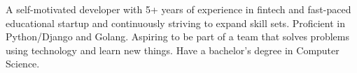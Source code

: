 

\begin{cvparagraph}

\vspace{1mm}
A self-motivated developer with 5+ years of experience in fintech and fast-paced educational startup
and continuously striving to expand skill sets. Proficient in Python/Django and Golang.
Aspiring to be part of a team that solves problems using technology and learn new things. Have a bachelor’s degree in Computer Science.
\end{cvparagraph}
